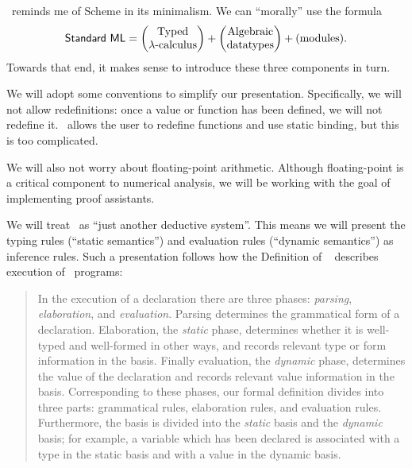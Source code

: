 \begin{node}\label{sml-0000}%
\SML\ reminds me of Scheme in its minimalism. We can ``morally'' use the
formula
\begin{equation*}
\mbox{\textsf{Standard ML}}=\begin{pmatrix}
\mbox{Typed}\\
\lambda\mbox{-calculus}
\end{pmatrix} + \begin{pmatrix}\mbox{Algebraic}\\
\mbox{datatypes}
\end{pmatrix} + (\mbox{modules}).
\end{equation*}
Towards that end, it makes sense to introduce these three components in turn.
\end{node}%

\begin{node}[Conventions]\label{sml-0001}%
We will adopt some conventions to simplify our
presentation. Specifically, we will not allow redefinitions: once a
value or function has been defined, we will not redefine
it. \SML\ allows the user to redefine functions and use static binding,
but this is too complicated.

We will also not worry about floating-point arithmetic. Although
floating-point is a critical component to numerical analysis, we will be
working with the goal of implementing proof assistants.
\end{node}

\begin{node}\label{sml-0002}%
We will treat \SML\ as ``just another deductive system''. This means we
will present the typing rules (``static semantics'') and evaluation
rules (``dynamic semantics'') as inference rules. Such a presentation
follows how the Definition of \SML~\cite[\S1]{milner1997definition}
describes execution of \SML\ programs:
\begin{quote}
In the execution of a declaration there are three phases:
\emph{parsing}, \emph{elaboration}, and \emph{evaluation}. Parsing
determines the grammatical form of a declaration. Elaboration, the
\emph{static} phase, determines whether it is well-typed and well-formed
in other ways, and records relevant type or form information in the
basis. Finally evaluation, the \emph{dynamic} phase, determines the
value of the declaration and records relevant value information in the
basis. Corresponding to these phases, our formal definition divides into
three parts: grammatical rules, elaboration rules, and evaluation
rules. Furthermore, the basis is divided into the \emph{static} basis
and the \emph{dynamic} basis; for example, a variable which has been
declared is associated with a type in the static basis and with a value
in the dynamic basis.
\end{quote}
\end{node}

